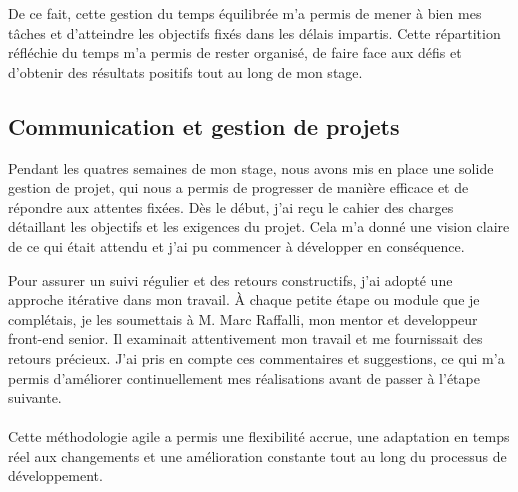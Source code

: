 De ce fait, cette gestion du temps équilibrée m'a permis de mener à bien mes tâches et d'atteindre les objectifs fixés dans les délais impartis. Cette répartition réfléchie du temps m'a permis de rester organisé, de faire face aux défis et d'obtenir des résultats positifs tout au long de mon stage.

\subsection*{Communication et gestion de projets}

Pendant les quatres semaines de mon stage, nous avons mis en place une solide gestion de projet, qui nous a permis de progresser de manière efficace et de répondre aux attentes fixées. Dès le début, j’ai reçu le cahier des charges détaillant les objectifs et les exigences du projet. Cela m’a donné une vision claire de ce qui était attendu et j’ai pu commencer à développer en conséquence.

Pour assurer un suivi régulier et des retours constructifs, j’ai adopté une approche itérative dans mon travail. À chaque petite étape ou module que je complétais, je les soumettais à M. Marc Raffalli, mon mentor et developpeur front-end senior. Il examinait attentivement mon travail et me fournissait des retours précieux. J’ai pris en compte ces commentaires et suggestions, ce qui m’a permis d’améliorer continuellement mes réalisations avant de passer à l’étape suivante.
\\ \\
Cette méthodologie agile a permis une flexibilité accrue, une adaptation en temps réel aux changements et une amélioration constante tout au long du processus de développement.

